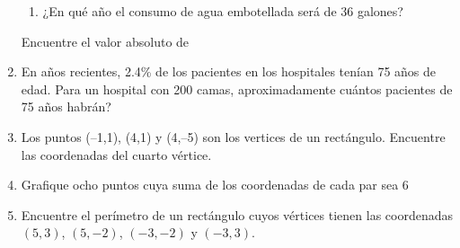 \documentclass[10pt,twoside]{article}
\begin{document}
\begin{enumerate}
\begin{enumerate}
\item ¿En qué año el consumo de agua embotellada será de 36 galones?
\end{enumerate}
Encuentre el valor absoluto de
\item En años recientes, 2.4\% de los pacientes en los hospitales tenían 75 años de edad. Para un hospital con 200 camas, aproximadamente cuántos pacientes de 75 años habrán?
\item Los puntos (--1,1), (4,1) y (4,--5) son los vertices de un rectángulo. Encuentre las coordenadas del cuarto vértice.
\item Grafique ocho puntos cuya suma de los coordenadas de cada par sea 6
\item Encuentre el perímetro de un rectángulo cuyos vértices tienen las coordenadas $(5,3)$, $(5,-2)$, $(-3,-2)$ y $(-3,3)$.
\end{enumerate}
\end{document}
